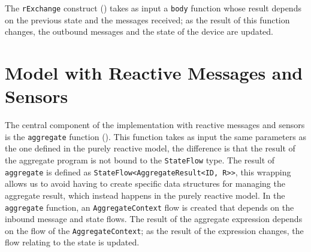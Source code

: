 The \texttt{rExchange} construct () takes as input a \texttt{body} function whose result depends on the previous state and the messages received; as the result of this function changes, the outbound messages and the state of the device are updated.









\section{Model with Reactive Messages and Sensors}
\label{section:mrms}

The central component of the implementation with reactive messages and sensors is the \texttt{aggregate} function (). This function takes as input the same parameters as the one defined in the purely reactive model, the difference is that the result of the aggregate program is not bound to the \texttt{StateFlow} type. The result of \texttt{aggregate} is defined as \texttt{StateFlow<AggregateResult<ID, R>>}, this wrapping allows us to avoid having to create specific data structures for managing the aggregate result, which instead happens in the purely reactive model. In the \texttt{aggregate} function, an \texttt{AggregateContext} flow is created that depends on the inbound message and state flows. The result of the aggregate expression depends on the flow of the \texttt{AggregateContext}; as the result of the expression changes, the flow relating to the state is updated.


